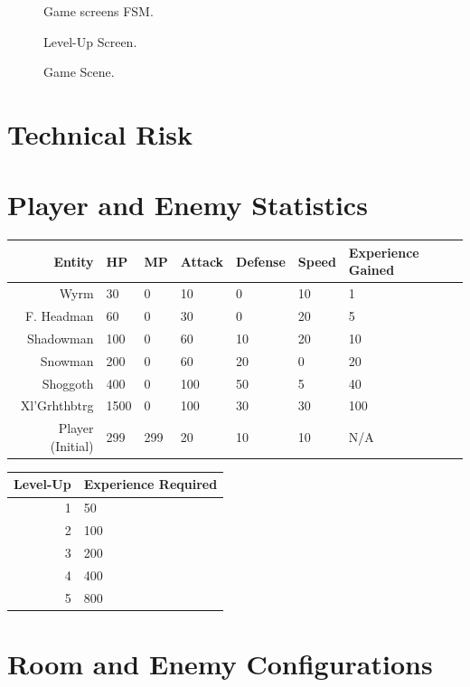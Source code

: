 \documentclass{article}
\begin{document}
\begin{figure}[h!]
{

}
\caption{Game screens FSM.}
\label{FSMMenus}
\end{figure}

\begin{figure}[h!]
{

}
\caption{Level-Up Screen.}
\label{LevelupScreen}
\end{figure}

\begin{figure}[h!]
{

}
\caption{Game Scene.}
\label{GameScene}
\end{figure}


\section{Technical Risk}

\label{StatsSection}
\section{Player and Enemy Statistics}

\begin{tabular}{|r|l|l|l|l|l|l|}
\hline
Entity & HP & MP & Attack & Defense & Speed & Experience Gained\\
\hline
Wyrm&30&0&10&0&10&1\\
F. Headman&60&0&30&0&20&5\\
Shadowman&100&0&60&10&20&10\\
Snowman&200&0&60&20&0&20\\
Shoggoth&400&0&100&50&5&40\\
Xl'Grhthbtrg&1500&0&100&30&30&100\\
Player (Initial)&299&299&20&10&10&N/A\\
\hline

\end{tabular}

\begin{tabular}{|r|l|}
\hline
Level-Up&Experience Required\\
\hline
1&50\\
2&100\\
3&200\\
4&400\\
5&800\\
\hline
\end{tabular}

\label{RoomAndEnemy}
\section{Room and Enemy Configurations}
\end{document}
